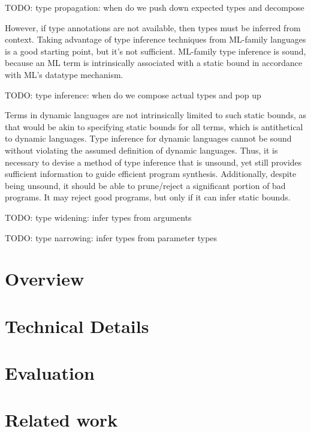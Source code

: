 \documentclass[]{acmart}
\begin{document}
TODO: type propagation: when do we push down expected types and decompose

However, if type annotations are not available, then types must be inferred from context. 
Taking advantage of type inference techniques from ML-family languages is a good starting point,
but it's not sufficient. ML-family type inference is sound, because an ML term is 
intrinsically associated with a static bound in accordance with ML's datatype mechanism.

TODO: type inference: when do we compose actual types and pop up

Terms in dynamic languages are not intrinsically limited to such static bounds, as that would be akin
to specifying static bounds for all terms, which is antithetical to dynamic languages. 
Type inference for dynamic languages cannot be sound without violating 
the assumed definition of dynamic languages. 
Thus, it is necessary to devise a method of type inference that is unsound, yet still provides   
sufficient information to guide efficient program synthesis.
Additionally, despite being unsound, it should be able to prune/reject 
a significant portion of bad programs. 
It may reject good programs, but only if it can infer static bounds.

TODO: type widening: infer types from arguments

TODO: type narrowing: infer types from parameter types




\section{Overview}

\section{Technical Details}

\section{Evaluation}

\section{Related work}





\end{document}

